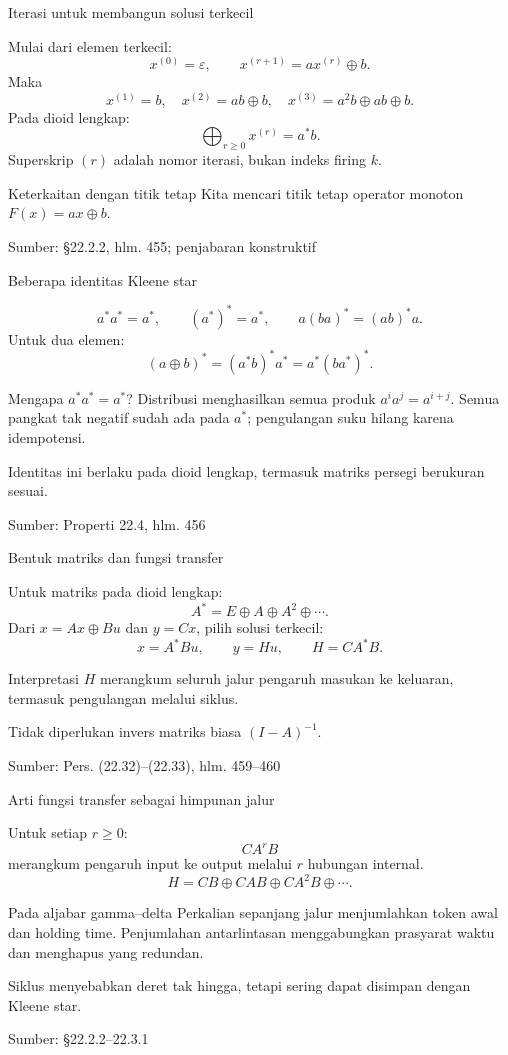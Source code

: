 \documentclass[aspectratio=169,11pt]{beamer}
\newcommand{\source}[1]{%
    \vfill
    \hfill{\tiny\color{gray}Sumber: #1}
}
\newcommand{\eps}{\varepsilon}
\begin{document}
\begin{frame}{Iterasi untuk membangun solusi terkecil}

Mulai dari elemen terkecil:
\[
x^{(0)}=\eps,\qquad x^{(r+1)}=ax^{(r)}\oplus b.
\]
Maka
\[
x^{(1)}=b,\quad x^{(2)}=ab\oplus b,\quad
x^{(3)}=a^2b\oplus ab\oplus b.
\]
Pada dioid lengkap:
\[
\bigoplus_{r\ge0}x^{(r)}=a^*b.
\]
Superskrip $(r)$ adalah nomor iterasi, bukan indeks firing $k$.
\begin{block}{Keterkaitan dengan titik tetap}
Kita mencari titik tetap operator monoton $F(x)=ax\oplus b$.
\end{block}

\source{\S22.2.2, hlm. 455; penjabaran konstruktif}
\end{frame}
\begin{frame}{Beberapa identitas Kleene star}

\[
a^*a^*=a^*,\qquad (a^*)^*=a^*,\qquad
a(ba)^*=(ab)^*a.
\]
Untuk dua elemen:
\[
(a\oplus b)^*=(a^*b)^*a^*=a^*(ba^*)^*.
\]
\begin{exampleblock}{Mengapa $a^*a^*=a^*$?}
Distribusi menghasilkan semua produk $a^ia^j=a^{i+j}$.
Semua pangkat tak negatif sudah ada pada $a^*$;
pengulangan suku hilang karena idempotensi.
\end{exampleblock}
Identitas ini berlaku pada dioid lengkap, termasuk matriks persegi berukuran sesuai.

\source{Properti 22.4, hlm. 456}
\end{frame}
\begin{frame}{Bentuk matriks dan fungsi transfer}


Untuk matriks pada dioid lengkap:
\[
A^*=E\oplus A\oplus A^2\oplus\cdots.
\]
Dari $x=Ax\oplus Bu$ dan $y=Cx$, pilih solusi terkecil:
\[
x=A^*Bu,\qquad y=Hu,\qquad H=CA^*B.
\]
\begin{block}{Interpretasi}
$H$ merangkum seluruh jalur pengaruh masukan ke keluaran,
termasuk pengulangan melalui siklus.
\end{block}
Tidak diperlukan invers matriks biasa $(I-A)^{-1}$.

\source{Pers. (22.32)--(22.33), hlm. 459--460}

\end{frame}
\begin{frame}{Arti fungsi transfer sebagai himpunan jalur}

Untuk setiap $r\ge0$:
\[
CA^rB
\]
merangkum pengaruh input ke output melalui $r$ hubungan internal.
\[
H=CB\oplus CAB\oplus CA^2B\oplus\cdots.
\]
\begin{exampleblock}{Pada aljabar gamma--delta}
Perkalian sepanjang jalur menjumlahkan token awal dan holding time.
Penjumlahan antarlintasan menggabungkan prasyarat waktu dan menghapus yang redundan.
\end{exampleblock}
Siklus menyebabkan deret tak hingga, tetapi sering dapat disimpan dengan Kleene star.

\source{\S22.2.2--22.3.1}
\end{frame}
\end{document}
